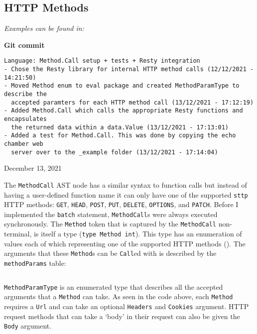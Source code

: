 \subsection{HTTP Methods}

\textit{Examples can be found in: }

\begin{center}
    \textbf{Git commit}
    \begin{verbatim}
Language: Method.Call setup + tests + Resty integration
- Chose the Resty library for internal HTTP method calls (12/12/2021 - 14:21:50)
- Moved Method enum to eval package and created MethodParamType to describe the
  accepted paramters for each HTTP method call (13/12/2021 - 17:12:19)
- Added Method.Call which calls the appropriate Resty functions and encapsulates
  the returned data within a data.Value (13/12/2021 - 17:13:01)
- Added a test for Method.Call. This was done by copying the echo chamber web
  server over to the _example folder (13/12/2021 - 17:14:04)
    \end{verbatim}
    \vspace{-1em}
    \tiny{December 13, 2021}
\end{center}

The \verb|MethodCall| AST node has a similar syntax to function calls but instead of having a user-defined function name it can only have one of the supported \verb|sttp| HTTP methods\textsuperscript{\cite{http_request_methods}}: \verb|GET|, \verb|HEAD|, \verb|POST|, \verb|PUT|, \verb|DELETE|, \verb|OPTIONS|, and \verb|PATCH|. Before I implemented the \verb|batch| statement, \verb|MethodCall|s were always executed synchronously. The \verb|Method| token that is captured by the \verb|MethodCall| non-terminal, is itself a type (\texttt{type Method int}). This type has an enumeration of values each of which representing one of the supported HTTP methods (). The arguments that these \verb|Method|s can be \verb|Call|ed with is described by the \verb|methodParams| table:

\inputminted[firstline=76, lastline=86, autogobble, breaklines, tabsize=4]{go}{../../src/eval/methods.go}

\verb|MethodParamType| is an enumerated type that describes all the accepted arguments that a \verb|Method| can take. As seen in the code above, each \verb|Method| requires a \verb|Url| and can take an optional \verb|Headers| and \verb|Cookies| argument. HTTP request methods that can take a `body' in their request can also be given the \verb|Body| argument.

